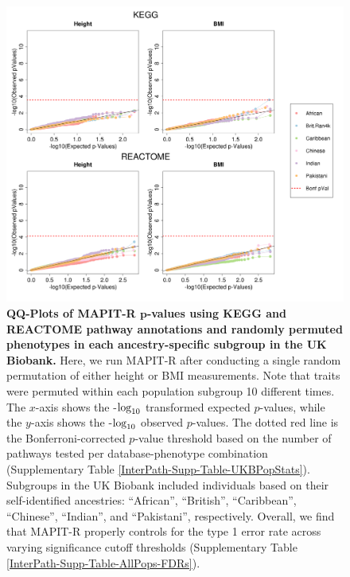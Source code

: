 \documentclass[10pt]{article}
\def\log{{\rm log}}
\begin{document}

\begin{figure}[htbp]
\centering
\includegraphics[width = \textwidth]{Images/Supp/InterPath_Supp_Figure_perm1_QQPlots_AllPaths_vs2.png}
\caption{\textbf{QQ-Plots of MAPIT-R $\bm{p}$-values using KEGG and REACTOME pathway annotations and randomly permuted phenotypes in each ancestry-specific subgroup in the UK Biobank.} Here, we run MAPIT-R after conducting a single random permutation of either height or BMI measurements. Note that traits were permuted within each population subgroup 10 different times. The $x$-axis shows the -$\log_{10}$ transformed expected $p$-values, while the $y$-axis shows the -$\log_{10}$ observed $p$-values. The dotted red line is the Bonferroni-corrected $p$-value threshold based on the number of pathways tested per database-phenotype combination (Supplementary Table \ref{InterPath-Supp-Table-UKBPopStats}). Subgroups in the UK Biobank included individuals based on their self-identified ancestries: ``African'', ``British'', ``Caribbean'', ``Chinese'', ``Indian'', and ``Pakistani'', respectively. Overall, we find that MAPIT-R properly controls for the type 1 error rate across varying significance cutoff thresholds (Supplementary Table \ref{InterPath-Supp-Table-AllPops-FDRs}).}
\label{InterPath-Supp-Figure-perm1-QQPlots-AllPaths}
\end{figure}
\clearpage

\end{document}
